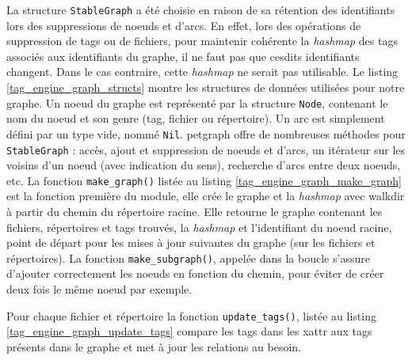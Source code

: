 La structure \texttt{StableGraph} a été choisie en raison de sa rétention des identifiants lors 
des suppressions de noeuds et d'arcs. En effet, lors des opérations de suppression de tags ou de 
fichiers, pour maintenir cohérente la \textit{hashmap} des tags associés aux identifiants du graphe, il 
ne faut pas que cesdits identifiants changent. Dans le cas contraire, cette \textit{hashmap} ne 
serait pas utilisable. Le listing \ref{tag_engine_graph_structs} montre les structures de données 
utilisées pour notre graphe. Un noeud du graphe est représenté par la structure \texttt{Node}, 
contenant le nom du noeud et son genre (tag, fichier ou répertoire). Un arc est simplement défini 
par un type vide, nommé \texttt{Nil}. petgraph offre de nombreuses méthodes pour 
\texttt{StableGraph} : accès, ajout et suppression de noeuds et d'arcs, un itérateur sur 
les voisins d'un noeud (avec indication du sens), recherche d'arcs entre deux noeuds, etc. La 
fonction \texttt{make_graph()} listée au listing \ref{tag_engine_graph_make_graph} est 
la fonction première du module, elle crée le graphe et la \textit{hashmap} avec walkdir à partir du
chemin du répertoire racine. Elle retourne le graphe contenant les fichiers, répertoires et tags 
trouvés, la \textit{hashmap} et l'identifiant du noeud racine, point de départ pour les mises à 
jour suivantes du graphe (sur les fichiers et répertoires). La fonction \texttt{make_subgraph()}, 
appelée dans la boucle s'assure d'ajouter correctement les noeuds en fonction du chemin, pour éviter 
de créer deux fois le même noeud par exemple.
\bigbreak
{}
\bigbreak
\bigbreak
{}
\bigbreak
Pour chaque fichier et répertoire la fonction \texttt{update_tags()}, listée au listing 
\ref{tag_engine_graph_update_tags} compare les tags dans les \acrshort{xattr} aux tags présents 
dans le graphe et met à jour les relations au besoin.
\bigbreak
{}
\bigbreak

